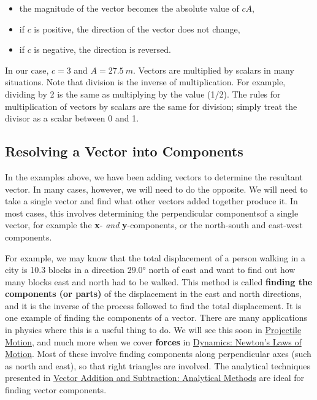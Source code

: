 \documentclass[
]{book}
\providecommand{\tightlist}{%
  \setlength{\itemsep}{0pt}\setlength{\parskip}{0pt}}
\begin{document}
\begin{itemize}
\tightlist
\item
  \protect\hypertarget{import-auto-id1165298651742}{}{the magnitude of the vector becomes the absolute value of
  \(c{}\)\(A{}\),}
\item
  \protect\hypertarget{import-auto-id1165298881521}{}{if \(c{}\) is positive, the direction of the vector does not
  change,}
\item
  \protect\hypertarget{import-auto-id1165298455414}{}{if \(c{}\) is negative, the direction is
  reversed.}
\end{itemize}

In our case, \(c = 3\) and \(A = 27.5\ m\). Vectors are multiplied by
scalars in many situations. Note that division is the inverse of
multiplication. For example, dividing by 2 is the same as multiplying by
the value (1/2). The rules for multiplication of vectors by scalars are
the same for division; simply treat the divisor as a scalar between 0
and 1.

\hypertarget{fs-id1165298819725}{}
\hypertarget{resolving-a-vector-into-components}{%
\subsection{Resolving a Vector into Components}\label{resolving-a-vector-into-components}}

In the examples above, we have been adding vectors to determine the
resultant vector. In many cases, however, we will need to do the
opposite. We will need to take a single vector and find what other
vectors added together produce it. In most cases, this involves
determining the perpendicular \protect\hypertarget{import-auto-id1165298555736}{}{components}of a single vector, for example the \textbf{x}- \emph{and}
\textbf{y}-components, or the north-south and east-west components.

For example, we may know that the total displacement of a person walking
in a city is 10.3 blocks in a direction \(\text{29}\text{.0°}\) north of
east and want to find out how many blocks east and north had to be
walked. This method is called \textbf{finding the components (or parts)} of
the displacement in the east and north directions, and it is the inverse
of the process followed to find the total displacement. It is one
example of finding the components of a vector. There are many
applications in physics where this is a useful thing to do. We will see
this soon in \href{/m54787}{Projectile Motion}, and much more when we cover
\textbf{forces} in \href{/m54802}{Dynamics: Newton's Laws of Motion}. Most of
these involve finding components along perpendicular axes (such as north
and east), so that right triangles are involved. The analytical
techniques presented in \href{/m54783}{Vector Addition and Subtraction: Analytical
Methods} are ideal for finding vector components.
\end{document}
